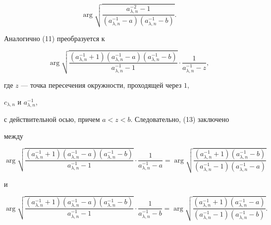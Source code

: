 \begin{pf}
\begin{equation}
\arg\sqrt{\frac{a^{-2}_{\lambda,n}-1}


{(a^{-1}_{\lambda,n}-a)(a^{-1}_{\lambda,n}-b)}}.


\end{equation}


Аналогично (11) преобразуется к


\begin{equation}


\arg\sqrt{\frac{(a^{-1}_{\lambda,n}+1)


(a^{-1}_{\lambda,n}-a)(a^{-1}_{\lambda,n}-b)}


{a^{-1}_{\lambda,n}-1}}


\cdot\frac{1}{a^{-1}_{\lambda,n}-z},


\end{equation}


где $z$ --- точка пересечения окружности, проходящей через $1$,


$c_{\lambda,n}$ и $a^{-1}_{\lambda,n}$,


с действительной осью, причем $a<z<b$. Следовательно, (13) заключено


между


\begin{equation}


\arg\sqrt{\frac{(a^{-1}_{\lambda,n}+1)


(a^{-1}_{\lambda,n}-a)(a^{-1}_{\lambda,n}-b)}


{a^{-1}_{\lambda,n}-1}}


\cdot\frac{1}{a^{-1}_{\lambda,n}-a}


=\arg\sqrt{\frac{(a^{-1}_{\lambda,n}+1)(a^{-1}_{\lambda,n}-b)}


{(a^{-1}_{\lambda,n}-1)(a^{-1}_{\lambda,n}-a)}}


\end{equation}


и


\begin{equation}


\arg\sqrt{\frac{(a^{-1}_{\lambda,n}+1)


(a^{-1}_{\lambda,n}-a)(a^{-1}_{\lambda,n}-b)}


{a^{-1}_{\lambda,n}-1}}


\cdot\frac{1}{a^{-1}_{\lambda,n}-b}


=\arg\sqrt{\frac{(a^{-1}_{\lambda,n}+1)(a^{-1}_{\lambda,n}-a)}


{(a^{-1}_{\lambda,n}-1)(a^{-1}_{\lambda,n}-b)}}.


\end{equation}



\end{pf}
